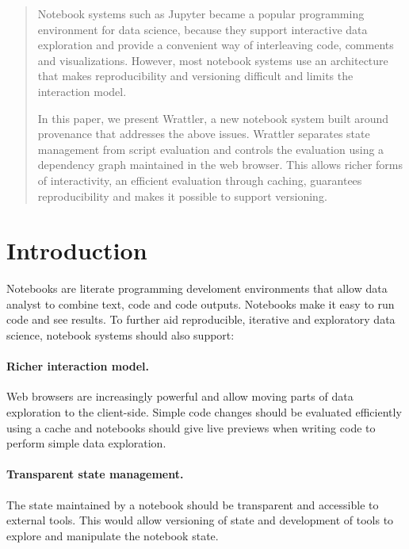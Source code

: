 \documentclass[sigplan]{acmart}\settopmatter{printfolios=true,printccs=false,printacmref=false}
\begin{document}
\begin{abstract}
Notebook systems such as Jupyter became a popular programming environment for data science, because 
they support interactive data exploration and provide a convenient way of interleaving code, 
comments and visualizations. However, most notebook systems use an architecture that makes
reproducibility and versioning difficult and limits the interaction model.

In this paper, we present Wrattler, a new notebook system built around provenance that addresses
the above issues. Wrattler separates state management from script evaluation and controls the 
evaluation using a dependency graph maintained in the web browser. This allows richer forms of 
interactivity, an efficient evaluation through caching, guarantees reproducibility and makes it 
possible to support versioning.
\end{abstract}
\maketitle

\section{Introduction}
Notebooks \cite{ipython,jupyter} are literate programming \cite{literate} develoment
environments that allow data analyst to combine text, code and code outputs. Notebooks make
it easy to run code and see results. To further aid reproducible, iterative and exploratory data 
science, notebook systems should also support:

\paragraph{Richer interaction model.}
Web browsers are increasingly powerful and allow moving parts of data exploration to the client-side. 
Simple code changes should be evaluated efficiently using a cache and notebooks
should give live previews when writing code to perform simple data exploration.

\paragraph{Transparent state management.}
The state maintained by a notebook should be transparent and accessible to external tools. This
would allow versioning of state and development of tools to explore and manipulate the notebook state.
\end{document}
